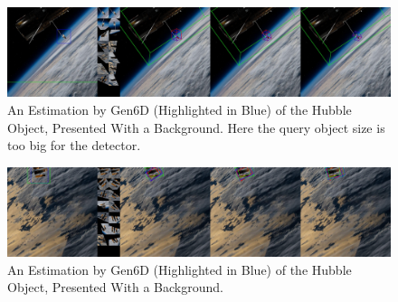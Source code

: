 \begin{figure}[ht]
  \centering
  \includegraphics[width=\textwidth]{data/res4.jpg}
  \caption{An Estimation by Gen6D (Highlighted in Blue) of the Hubble Object, Presented With a Background. Here the query object size is too big for the detector.}
  \label{fig:cap4}
\end{figure}

\begin{figure}[ht]
  \centering
  \includegraphics[width=\textwidth]{data/res1.jpg}
  \caption{An Estimation by Gen6D (Highlighted in Blue) of the Hubble Object, Presented With a Background.}
  \label{fig:cap2}
\end{figure}



